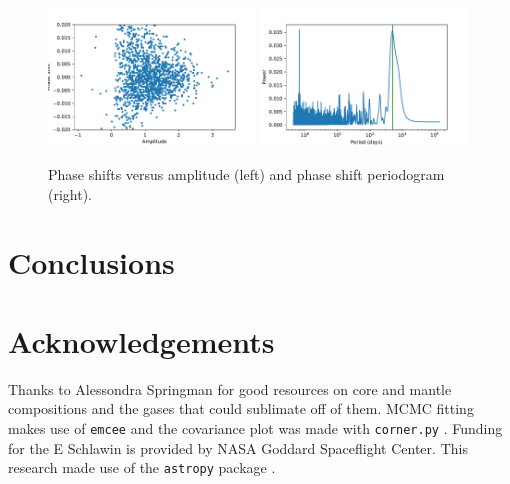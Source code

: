 \documentclass[preprint]{aastex61}
\begin{document}
\begin{figure}[!hbtp]
\begin{centering}
\includegraphics[width=0.49\textwidth]{images/kepler/phase_shift_vs_amplitude.pdf}
\includegraphics[width=0.49\textwidth]{images/kepler/phase_shifts_periodogram.pdf}
\caption{Phase shifts versus amplitude (left) and phase shift periodogram (right).}\label{fig:phaseShift}
\end{centering}
\end{figure}



\section{Conclusions}\label{sec:conclusions}

\section{Acknowledgements}
Thanks to Alessondra Springman for good resources on core and mantle compositions and the gases that could sublimate off of them.
MCMC fitting makes use of \texttt{emcee} \citep{foreman-mackey2013emcee} and the covariance plot was made with \texttt{corner.py} \citep{foremanCorner}.
Funding for the E Schlawin is provided by NASA Goddard Spaceflight Center.
This research made use of the \texttt{astropy} package \citep{astropy2013}.

\end{document}
